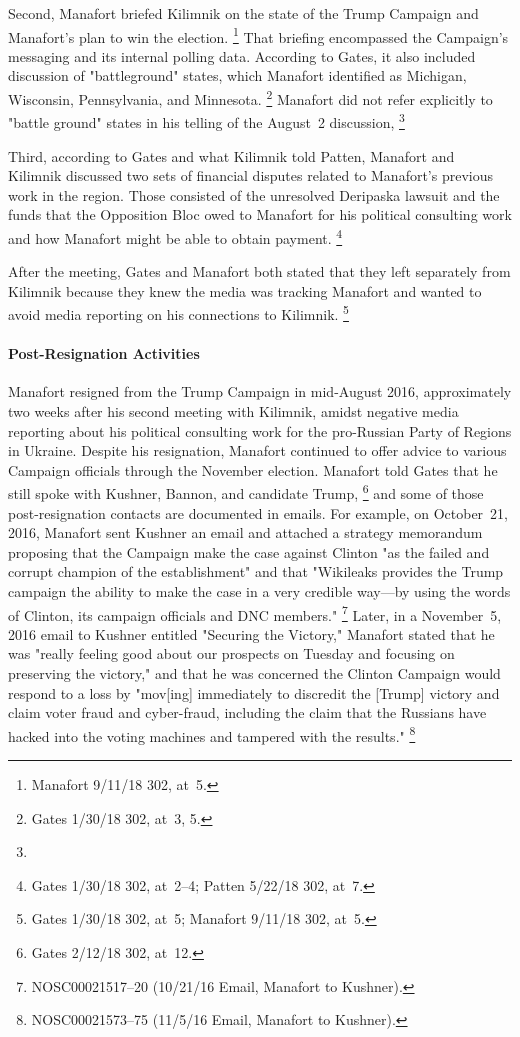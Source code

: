 Second, Manafort briefed Kilimnik on the state of the Trump Campaign and Manafort's plan to win the election.%
\footnote{Manafort 9/11/18 302, at~5.}
That briefing encompassed the Campaign's messaging and its internal polling data.
According to Gates, it also included discussion of "battleground" states, which Manafort identified as Michigan, Wisconsin, Pennsylvania, and Minnesota.%
\footnote{Gates 1/30/18 302, at~3, 5.}
Manafort did not refer explicitly to "battle ground" states in his telling of the August~2 discussion,
\footnote{}

Third, according to Gates and what Kilimnik told Patten, Manafort and Kilimnik discussed two sets of financial disputes related to Manafort's previous work in the region.
Those consisted of the unresolved Deripaska lawsuit and the funds that the Opposition Bloc owed to Manafort for his political consulting work and how Manafort might be able to obtain payment.%
\footnote{Gates 1/30/18 302, at~2--4;
Patten 5/22/18 302, at~7.}

After the meeting, Gates and Manafort both stated that they left separately from Kilimnik because they knew the media was tracking Manafort and wanted to avoid media reporting on his connections to Kilimnik.%
\footnote{Gates 1/30/18 302, at~5;
Manafort 9/11/18 302, at~5.}

\paragraph{Post-Resignation Activities}

Manafort resigned from the Trump Campaign in mid-August 2016, approximately two weeks after his second meeting with Kilimnik, amidst negative media reporting about his political consulting work for the pro-Russian Party of Regions in Ukraine.
Despite his resignation, Manafort continued to offer advice to various Campaign officials through the November election.
Manafort told Gates that he still spoke with Kushner, Bannon, and candidate Trump,%
\footnote{Gates 2/12/18 302, at~12.}
and some of those post-resignation contacts are documented in emails.
For example, on October~21, 2016, Manafort sent Kushner an email and attached a strategy memorandum proposing that the Campaign make the case against Clinton "as the failed and corrupt champion of the establishment" and that "Wikileaks provides the Trump campaign the ability to make the case in a very credible way---by using the words of Clinton, its campaign officials and DNC members."%
\footnote{NOSC00021517--20 (10/21/16 Email, Manafort to Kushner).}
Later, in a November~5, 2016 email to Kushner entitled "Securing the Victory," Manafort stated that he was "really feeling good about our prospects on Tuesday and focusing on preserving the victory," and that he was concerned the Clinton Campaign would respond to a loss by "mov[ing] immediately to discredit the [Trump] victory and claim voter fraud and cyber-fraud, including the claim that the Russians have hacked into the voting machines and tampered with the results."%
\footnote{NOSC00021573--75 (11/5/16 Email, Manafort to Kushner).}

